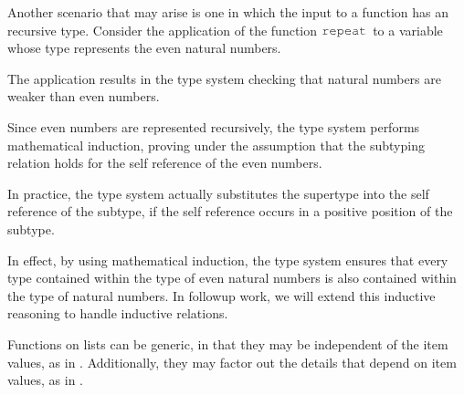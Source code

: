 \documentclass[acmsmall]{acmart}
\theoremstyle{definition}
\begin{document}
Another scenario that may arise is one in which the input to a function has an recursive type.
Consider the application of the function $\J{repeat}$ to a variable whose type represents the even natural numbers.


\noindent
The application results in the type system checking that natural numbers are weaker than even numbers. 


\noindent
Since even numbers are represented recursively, the type system performs mathematical induction,
proving under the assumption that the subtyping relation holds for the self reference of the even numbers. 


\noindent
In practice, the type system actually substitutes the supertype into
the self reference of the subtype, if the self reference occurs in a positive position of the subtype.


\noindent
In effect, by using mathematical induction, the type system ensures that 
every type contained within the type of even natural numbers is also
contained within the type of natural numbers.
In followup work, we will extend this inductive reasoning to handle inductive relations. 

Functions on lists can be generic, in that they may be independent of the item values, as in .
Additionally, they may factor out the details that depend on item values, as in . 

\end{document}
